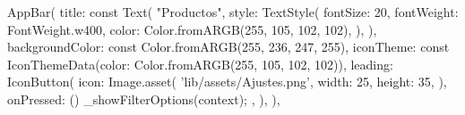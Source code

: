 AppBar(
        title: const Text(
          "Productos",
          style: TextStyle(
            fontSize: 20,
            fontWeight: FontWeight.w400,
            color: Color.fromARGB(255, 105, 102, 102),
          ),
        ),
        backgroundColor: const Color.fromARGB(255, 236, 247, 255),
        iconTheme:
            const IconThemeData(color: Color.fromARGB(255, 105, 102, 102)),
        leading: IconButton(
          icon: Image.asset(
            'lib/assets/Ajustes.png',
            width: 25,
            height: 35,
          ),
          onPressed: () {
            _showFilterOptions(context);
          },
        ),
      ),